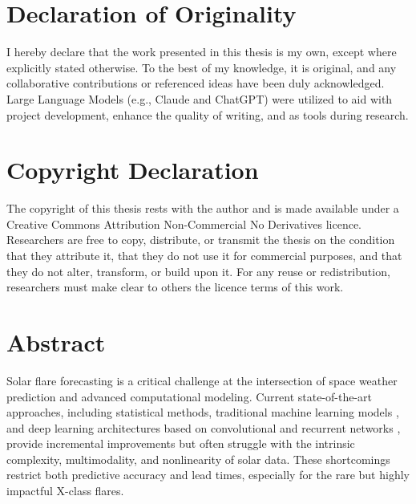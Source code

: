 \documentclass[12pt,a4paper,oneside]{report}
\begin{document}


\clearpage
{}

\clearpage
\section*{Declaration of Originality}

\noindent
I hereby declare that the work presented in this thesis is my own, except where explicitly stated otherwise. To the best of my knowledge, it is original, and any collaborative contributions or referenced ideas have been duly acknowledged. Large Language Models (e.g., Claude and ChatGPT) were utilized to aid with project development, enhance the quality of writing, and as tools during research.

\vspace{2cm} %

\section*{Copyright Declaration}

\noindent
The copyright of this thesis rests with the author and is made available under a Creative Commons Attribution Non-Commercial No Derivatives licence. Researchers are free to copy, distribute, or transmit the thesis on the condition that they attribute it, that they do not use it for commercial purposes, and that they do not alter, transform, or build upon it. For any reuse or redistribution, researchers must make clear to others the licence terms of this work.

\clearpage
\section*{Abstract}
Solar flare forecasting is a critical challenge at the intersection of space weather prediction and advanced computational modeling. Current state-of-the-art approaches, including statistical methods, traditional machine learning models \cite{RefWorks:RefID:12-zheng2023comparative}, and deep learning architectures based on convolutional and recurrent networks \cite{RefWorks:RefID:10-jiao2020solar}, provide incremental improvements but often struggle with the intrinsic complexity, multimodality, and nonlinearity of solar data. These shortcomings restrict both predictive accuracy and lead times, especially for the rare but highly impactful X-class flares.
\end{document}
